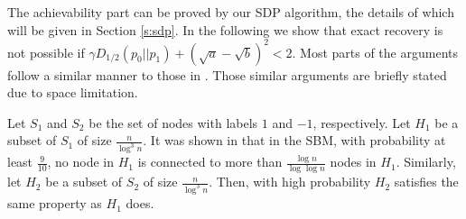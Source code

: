 \documentclass[conference]{IEEEtran}
\begin{document}
%		
		The achievability part can be proved by our SDP algorithm, the details of which will be given in  Section \ref{s:sdp}.
		In the following we show that exact recovery is not possible if $\gamma D_{1/2}(p_0||p_1) + (\sqrt{a} - \sqrt{b})^2 < 2$. Most parts of the arguments follow a similar manner to those in \cite{abbe2015exact}. Those similar arguments are briefly stated due to space limitation. 
		
		Let $S_1$ and $S_2$ be the set of nodes with labels $1$ and $-1$, respectively. Let $H_1$ be a subset of $S_1$ of size $\frac{n}{\log^3 n}$. It was shown in \cite{abbe2015exact} that in the SBM, with probability at least $\frac{9}{10}$, no node in $H_1$ is connected to more than $\frac{\log n}{\log\log n}$ nodes in $H_1$. Similarly, let $H_2$ be a subset of $S_2$ of size $\frac{n}{\log^3 n}$. Then, with high probability $H_2$ satisfies the same property as $H_1$ does. 
		
\end{document}
